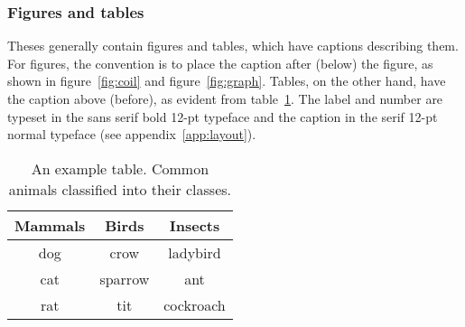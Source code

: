 \documentclass[english, 12pt, a4paper, sci, utf8, a-2b, online]{aaltothesis}
\begin{document}
\subsubsection{Figures and tables}

Theses generally contain figures and tables, which have captions describing 
them. For figures, the convention is to place the caption after (below) the 
figure, as shown in figure~\ref{fig:coil} and figure~\ref{fig:graph}. Tables, on
the other hand, have the caption above (before), as evident from 
table~\ref{tab:animals}. The label and number are typeset in the sans serif bold
12-pt typeface and the caption in the serif 12-pt normal typeface (see 
appendix~\ref{app:layout}).



\begin{table}[tb]
	\centering
	\caption{An example table. Common animals classified into their classes.}
	\label{tab:animals}
	\sffamily%
	\begin{tabular}{ccc}
	  \hline
	  \textbf{Mammals} & \textbf{Birds} & \textbf{Insects}\\ \hline
	  dog & crow & ladybird \\ \hline
	  cat & sparrow & ant \\ \hline
	  rat & tit & cockroach \\ \hline
	\end{tabular}
\end{table}
\end{document}
